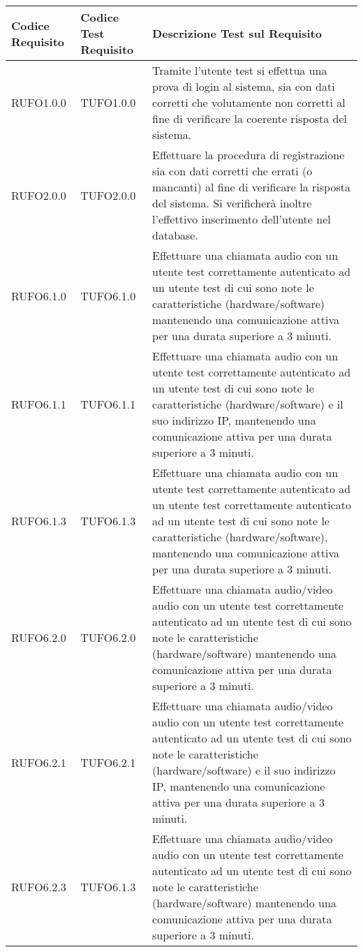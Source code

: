 \begin{center}
\begin{longtable}{llp{}}
\toprule Codice Requisito & Codice Test Requisito  & Descrizione Test sul Requisito\\
\midrule

RUFO1.0.0 & TUFO1.0.0 &Tramite l'utente test si effettua una prova di login al sistema, sia con dati corretti che volutamente non corretti al fine di verificare la coerente risposta del sistema.\\
RUFO2.0.0  & TUFO2.0.0 &Effettuare la procedura di registrazione sia con dati corretti che errati (o mancanti) al fine di verificare la risposta del sistema. Si verificherà inoltre l'effettivo inserimento dell'utente nel database.\\
RUFO6.1.0 & TUFO6.1.0& Effettuare una chiamata audio con un utente test correttamente autenticato ad un utente test di cui sono note le caratteristiche (hardware/software) mantenendo una comunicazione attiva per una durata superiore a 3 minuti.\\
RUFO6.1.1 & TUFO6.1.1& Effettuare una chiamata audio con un utente test correttamente autenticato ad un utente test di cui sono note le caratteristiche (hardware/software) e il suo indirizzo IP, mantenendo una comunicazione attiva per una durata superiore a 3 minuti.\\
RUFO6.1.3 & TUFO6.1.3& Effettuare una chiamata audio con un utente test correttamente autenticato ad un utente test correttamente autenticato ad un utente test di cui sono note le caratteristiche (hardware/software), mantenendo una comunicazione attiva per una durata superiore a 3 minuti.\\
RUFO6.2.0 & TUFO6.2.0& Effettuare una chiamata audio/video audio con un utente test correttamente autenticato ad un utente test di cui sono note le caratteristiche (hardware/software) mantenendo una comunicazione attiva per una durata superiore a 3 minuti.\\
RUFO6.2.1 & TUFO6.2.1& Effettuare una chiamata audio/video audio con un utente test correttamente autenticato ad un utente test di cui sono note le caratteristiche (hardware/software) e il suo indirizzo IP, mantenendo una comunicazione attiva per una durata superiore a 3 minuti.\\
RUFO6.2.3 & TUFO6.1.3& Effettuare una chiamata audio/video audio con un utente test correttamente autenticato ad un utente test di cui sono note le caratteristiche (hardware/software) mantenendo una comunicazione attiva per una durata superiore a 3 minuti.\\

\end{longtable}
\end{center}
